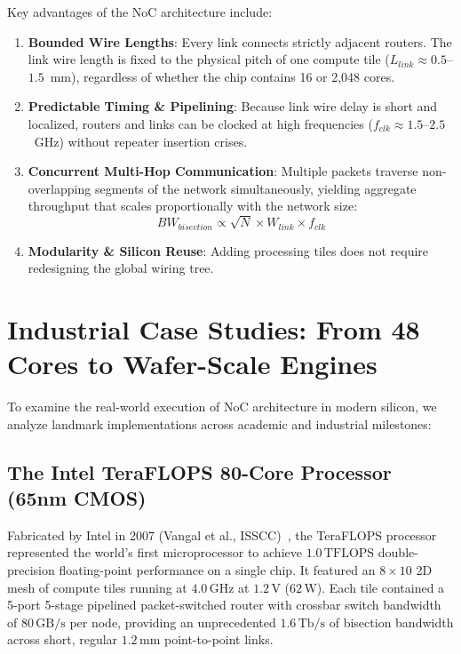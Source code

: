 Key advantages of the NoC architecture include:
\begin{enumerate}
    \item \textbf{Bounded Wire Lengths}: Every link connects strictly adjacent routers. The link wire length is fixed to the physical pitch of one compute tile ($L_{link} \approx 0.5$--$1.5$~mm), regardless of whether the chip contains 16 or 2,048 cores.
    \item \textbf{Predictable Timing \& Pipelining}: Because link wire delay is short and localized, routers and links can be clocked at high frequencies ($f_{clk} \approx 1.5$--$2.5$~GHz) without repeater insertion crises.
    \item \textbf{Concurrent Multi-Hop Communication}: Multiple packets traverse non-overlapping segments of the network simultaneously, yielding aggregate throughput that scales proportionally with the network size:
    \begin{equation}
    BW_{bisection} \propto \sqrt{N} \times W_{link} \times f_{clk}
    \label{eq:bisection_bw}
    \end{equation}
    \item \textbf{Modularity \& Silicon Reuse}: Adding processing tiles does not require redesigning the global wiring tree.
\end{enumerate}

\section{Industrial Case Studies: From 48 Cores to Wafer-Scale Engines}
\label{sec:ch1_case_studies}

To examine the real-world execution of NoC architecture in modern silicon, we analyze landmark implementations across academic and industrial milestones:

\subsection{The Intel TeraFLOPS 80-Core Processor (65nm CMOS)}
\label{subsec:ch1_intel_80core}

Fabricated by Intel in 2007 (Vangal et al., ISSCC)~\cite{Vangal2008}, the TeraFLOPS processor represented the world's first microprocessor to achieve $1.0\,\mathrm{TFLOPS}$ double-precision floating-point performance on a single chip. It featured an $8 \times 10$ 2D mesh of compute tiles running at $4.0\,\mathrm{GHz}$ at $1.2\,\mathrm{V}$ ($62\,\mathrm{W}$). Each tile contained a 5-port 5-stage pipelined packet-switched router with crossbar switch bandwidth of $80\,\mathrm{GB/s}$ per node, providing an unprecedented $1.6\,\mathrm{Tb/s}$ of bisection bandwidth across short, regular $1.2\,\mathrm{mm}$ point-to-point links.

